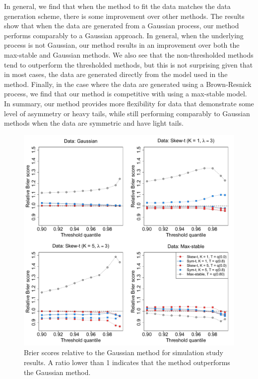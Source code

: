 \documentclass[useAMS,usenatbib,referee]{biom}
\begin{document}
In general, we find that when the method to fit the data matches the data generation scheme, there is some improvement over other methods.
The results show that when the data are generated from a Gaussian process, our method performs comparably to a Gaussian approach.
In general, when the underlying process is not Gaussian, our method results in an improvement over both the max-stable and Gaussian methods.
We also see that the non-thresholded methods tend to outperform the thresholded methods, but this is not surprising given that in most cases, the data are generated directly from the model used in the method.
Finally, in the case where the data are generated using a Brown-Resnick process, we find that our method is competitive with using a max-stable model.
In summary, our method provides more flexibility for data that demonstrate some level of asymmetry or heavy tails, while still performing comparably to Gaussian methods when the data are symmetric and have light tails.

\begin{figure}
  \includegraphics[width=\linewidth]{plots/bsplots-mean.pdf}
  \caption{Brier scores relative to the Gaussian method for simulation study results. A ratio lower than 1 indicates that the method outperforms the Gaussian method.}
  \label{stfig:simbrierscores}
\end{figure}
\end{document}
